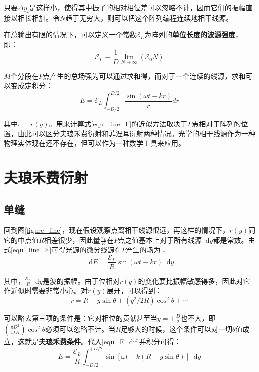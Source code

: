 \documentclass[UTF8]{ctexart}
\newcommand*{\dif}{\mathop{}\!\mathrm{d}}
\begin{document}
\noindent 只要$ \Delta y_{i} $是这样小，使得其中振子的相对相位差可以忽略不计，因而它们的振幅直接以相长相加。令$ N $趋于无穷大，则可以把这个阵列编程连续地相干线源。

	在总输出有限的情况下，可以定义一个常数$ \mathscr{E}_{L} $为阵列的\textbf{单位长度的波源强度}，即：
	\begin{equation}
	\mathscr{E}_{L} \equiv \frac{1}{D} \lim _{N \rightarrow \infty}\left(\mathscr{E}_{0} N\right)
	\end{equation}
	
\noindent $ M $个分段在$ P $点产生的总场强为可以通过求和得，而对于一个连续的线源，求和可以变成定积分：
\begin{equation}
	E=\mathscr{E}_{L} \int_{-D / 2}^{D / 2} \frac{\sin (\omega t-k r)}{r} d r \label{equ_line_E}
\end{equation}

\noindent 其中$ r=r(y) $。用来计算式\ref{equ_line_E}的近似方法取决于$ P $点相对于阵列的位置，由此可以区分夫琅禾费衍射和菲涅耳衍射两种情况。光学的相干线源作为一种物理实体现在还不存在，但可以作为一种数学工具来应用。

	\section{夫琅禾费衍射}
	\subsection{单缝}
	回到图\ref{figure_line}，现在假设观察点离相干线源很远，再这样的情况下，$ r(y) $同它的中点值$ R $相差很少，因此量$ \frac{\mathscr{E}_{L}}{R} $在$ P $点之值基本上对于所有线源$ \dif y $都是常数。由式\ref{equ_line_E}可得光源的微分线源在$ P $产生的场为：
	\begin{equation}
	\dif E=\frac{\mathscr{E}_{L}}{R} \sin (\omega t-k r) \dif y\label{equ_E_dif}
	\end{equation}
	
	其中，$\frac{\mathscr{E}_{L}}{R} \dif y$是波的振幅。由于位相对$ r(y) $的变化要比振幅敏感得多，因此对它作近似时需要非常小心。对$ r(y) $展开，可以得到：
	\begin{equation}
	r=R-y \sin \theta+\left(y^{2} / 2 R\right) \cos ^{2} \theta+\cdots
	\end{equation}
	
	可以略去第三项的条件是：它对相位的贡献甚至当$ y=\pm \frac{D}{2} $也不大，即$ \left(\frac{\pi D^{2}}{4 \lambda R}\right) \cos^{2} \theta $必须可以忽略不计。当$ R $足够大的时候，这个条件可以对一切$ \theta $值成立，这就是\textbf{夫琅禾费条件}。代入\ref{equ_E_dif}并积分可得：
	\begin{equation}
	E=\frac{\mathscr{E}_{L}}{R} \int_{-D / 2}^{+D / 2} \sin \left[\omega t-k(R-y \sin \theta)\right] \dif y
	\end{equation}
	
\end{document}
